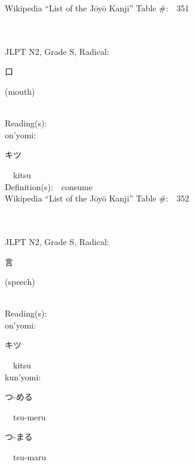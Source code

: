 \begin{multicols}{2}
Wikipedia ``List of the J\=oy\=o Kanji'' Table \#:\ \ 351 \\
\ \ \\
{\fontsize{34pt}{40pt}  }\ \ \\  %
{JLPT N2, Grade S, Radical:\ \ {\begin{CJK}{UTF8}{min} 口 \end{CJK}} (mouth) } \\
Reading(s):\ \ \\
{\hspace*{1em}}on'yomi:\ \ \\
{\hspace*{2em}}{\begin{CJK}{UTF8}{min} キツ \end{CJK}}\ \ kitsu\ \ \\
Definition(s):\ \ consume \\
Wikipedia ``List of the J\=oy\=o Kanji'' Table \#:\ \ 352 \\
\ \ \\
{\fontsize{34pt}{40pt}  }\ \ \\  %
{JLPT N2, Grade S, Radical:\ \ {\begin{CJK}{UTF8}{min} 言 \end{CJK}} (speech) } \\
Reading(s):\ \ \\
{\hspace*{1em}}on'yomi:\ \ \\
{\hspace*{2em}}{\begin{CJK}{UTF8}{min} キツ \end{CJK}}\ \ kitsu\ \ \\
{\hspace*{1em}}kun'yomi:\ \ \\
{\hspace*{2em}}{\begin{CJK}{UTF8}{min} つ-める \end{CJK}}\ \ tsu-meru\ \ \\
{\hspace*{2em}}{\begin{CJK}{UTF8}{min} つ-まる \end{CJK}}\ \ tsu-maru\ \ \\

\end{multicols}
